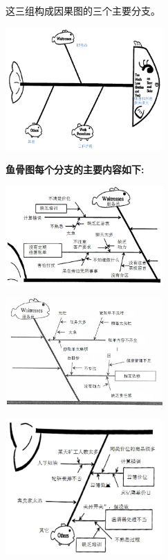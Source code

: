 这三组构成因果图的三个主要分支。


\includegraphics[width=6cm]{club111.png}

\textbf{鱼骨图每个分支的主要内容如下:}


\includegraphics[width=6cm]{club1211.jpg}


\includegraphics[width=6cm]{club1311.jpg}


\includegraphics[width=6cm]{club1412.jpg}

